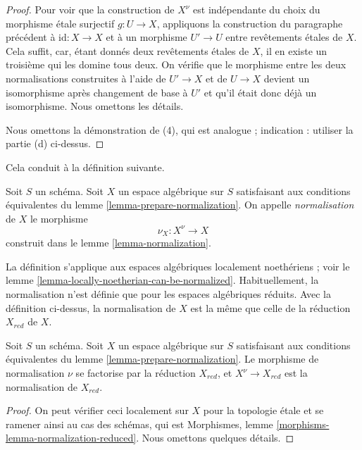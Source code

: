 \begin{proof}
\medskip\noindent
Pour voir que la construction de $X^\nu$ est indépendante du choix
du morphisme étale surjectif $g : U \to X$, appliquons la construction du
paragraphe précédent à $\text{id} : X \to X$ et à un morphisme
$U' \to U$ entre revêtements étales de $X$. Cela suffit, car,
étant donnés deux revêtements étales de $X$, il en existe un troisième qui
les domine tous deux. On vérifie que le morphisme entre les deux
normalisations construites à l'aide de $U' \to X$ et de $U \to X$
devient un isomorphisme après changement de base à $U'$ et qu'il était donc
déjà un isomorphisme. Nous omettons les détails.

\medskip\noindent
Nous omettons la démonstration de (4), qui est analogue ; indication : utiliser la partie (d) ci-dessus.
\end{proof}

\noindent
Cela conduit à la définition suivante.

\begin{definition}
\label{definition-normalization}
Soit $S$ un schéma. Soit $X$ un espace algébrique sur $S$ satisfaisant aux
conditions équivalentes du lemme \ref{lemma-prepare-normalization}.
On appelle {\it normalisation} de $X$ le morphisme
$$
\nu_X : X^\nu \longrightarrow X
$$
construit dans le lemme \ref{lemma-normalization}.
\end{definition}

\noindent
La définition s'applique aux espaces algébriques localement
noethériens ; voir le lemme \ref{lemma-locally-noetherian-can-be-normalized}.
Habituellement, la normalisation n'est définie que pour les espaces algébriques
réduits. Avec la définition ci-dessus, la normalisation de $X$ est la même
que celle de la réduction $X_{red}$ de $X$.

\begin{lemma}
\label{lemma-normalization-reduced}
Soit $S$ un schéma. Soit $X$ un espace algébrique sur $S$ satisfaisant aux
conditions équivalentes du lemme \ref{lemma-prepare-normalization}.
Le morphisme de normalisation $\nu$ se factorise par la réduction $X_{red}$,
et $X^\nu \to X_{red}$ est la normalisation de $X_{red}$.
\end{lemma}

\begin{proof}
On peut vérifier ceci localement sur $X$ pour la topologie étale et se ramener ainsi au cas
des schémas, qui est
Morphismes, lemme \ref{morphisms-lemma-normalization-reduced}.
Nous omettons quelques détails.
\end{proof}


